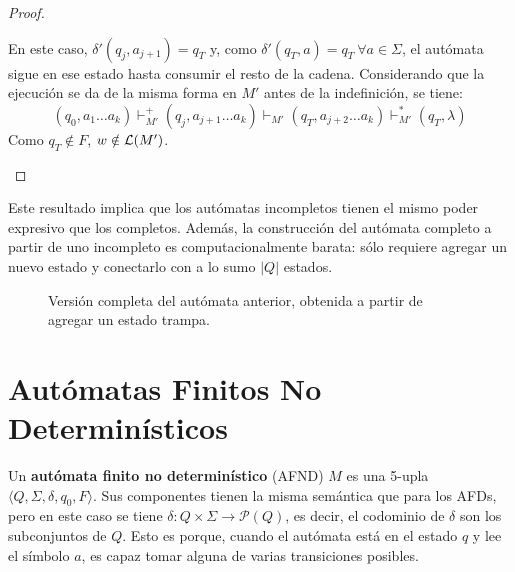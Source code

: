 \begin{proof}
\begin{itemize}
        En este caso, $\delta' (q_j, a_{j+1}) = q_T$ y, como $\delta'(q_T, a) = q_T\ \forall a \in \Sigma$, el autómata sigue en ese estado hasta consumir el resto de la cadena. Considerando que la ejecución se da de la misma forma en $M'$ antes de la indefinición, se tiene:
        $$(q_0, a_1 \dots a_k) \vdash_{M'}^+ (q_j, a_{j+1} \dots a_k) \vdash_{M'} (q_T, a_{j+2} \dots a_k) \vdash_{M'}^* (q_T, \lambda)$$
        Como $q_T \notin F$, $w \notin \mathcal{L}(M')$.
    \end{itemize}
\end{proof}

Este resultado implica que los autómatas incompletos tienen el mismo poder expresivo que los completos. Además, la construcción del autómata completo a partir de uno incompleto es computacionalmente barata: sólo requiere agregar un nuevo estado y conectarlo con a lo sumo $|Q|$ estados.

\begin{figure}[H]
    \centering
    \caption*{Versión completa del autómata anterior, obtenida a partir de agregar un estado trampa.}
\end{figure}

\section{Autómatas Finitos No Determinísticos}

Un \textbf{autómata finito no determinístico} (AFND) $M$ es una 5-upla $\langle Q, \Sigma, \delta, q_0, F \rangle$. Sus componentes tienen la misma semántica que para los AFDs, pero en este caso se tiene $\delta : Q \times \Sigma \to \mathcal P (Q)$, es decir, el codominio de $\delta$ son los subconjuntos de $Q$. Esto es porque, cuando el autómata está en el estado $q$ y lee el símbolo $a$, es capaz tomar alguna de varias transiciones posibles.

